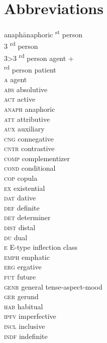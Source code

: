 ﻿\documentclass[output=paper,draft,draftmode,colorlinks,citecolor=brown]{langscibook}
\begin{document}
\section*{Abbreviations}
\begin{multicols}{2}
\begin{tabbing}
anaph\quad\=anaphoric				 \textsuperscript{st} person\\
3 				 \textsuperscript{rd} person\\
3>3				 \textsuperscript{rd} person agent + \\ \textsuperscript{rd} person patient\\
\textsc{a}	 \> agent\\
\textsc{abs}		 \> absolutive\\
\textsc{act}		 \> active\\
\textsc{anaph}		 \> anaphoric\\
\textsc{att}	 \> attributive\\
\textsc{aux}		 \> auxiliary\\
\textsc{cng}		 \> connegative\\
\textsc{cntr}		 \> contrastive\\
\textsc{comp}        \> complementizer\\
\textsc{cond}		 \> conditional\\
\textsc{cop}		 \> copula\\
\textsc{ex}		 \> existential\\
\textsc{dat} 	 \> dative\\
\textsc{def}		 \> definite\\
\textsc{det}	 \> determiner\\
\textsc{dist} 		 \> distal\\
\textsc{du}          \> dual\\
\textsc{e}           \> E-type inflection class\\
\textsc{emph}        \> emphatic\\
\textsc{erg}         \> ergative\\
\textsc{fut} 		 \> future\\
\textsc{genr}		 \> general tense-aspect-mood\\
\textsc{ger}		 \> gerund\\
\textsc{hab}		 \> habitual\\
\textsc{ipfv}		 \> imperfective\\
\textsc{incl}   \> inclusive\\
\textsc{indf}	     \> indefinite\\

\end{tabbing}
\end{multicols}
\end{document}
